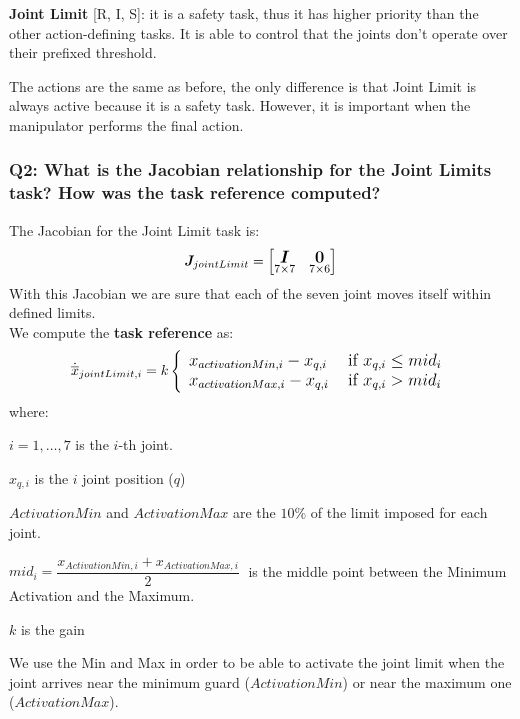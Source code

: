 \documentclass{article}
\newcommand{\ocio} {\marginpar{!}}
\begin{document}
\begin{description}
\item \textbf{Joint Limit} [R, I, S]: it is a safety task, thus it has higher priority than the other action-defining tasks. It is able to control that the joints don't operate over their prefixed threshold. \ocio
\end{description}

The actions are the same as before, the only difference is that Joint Limit is always active because it is a safety task. However, it is important when the manipulator performs the final action. 

\subsubsection{Q2: What is the Jacobian relationship for the Joint Limits task? How was the task reference computed?}
The Jacobian for the Joint Limit task is:
\begin{equation}
\large
\boldsymbol{J}_{jointLimit}=
    \begin{bmatrix}
     \underset{7\times 7}{\boldsymbol{I}} & \underset{7\times6}{\boldsymbol{0}} \\
    \end{bmatrix}
\end{equation}
With this Jacobian we are sure that each of the seven joint moves itself within defined limits.
\\
We compute the \textbf{task reference} as:
\begin{equation}
\large
\dot{\overline{x}}_{jointLimit,i} =k \left\{\begin{array}{ll}
x_{activationMin,i}-x_{q, i} & \text { if } x_{q, i} \leq mid_{i} \\
x_{activationMax,i}-x_{q, i} & \text { if } x_{q, i}>mid_{i}
\end{array}\right.
\end{equation}
 where:
 \begin{description}
  \item $i = 1,\dots,7$ is the $i$-th joint.
  \item $x_{q,i}$ is the $i$ joint position ($q$)
  \item $ActivationMin$ and $ActivationMax$ are the $10\%$ of the limit imposed for each joint.
  \item $mid_i = \dfrac{x_{ActivationMin,i} + x_{ActivationMax,i}}{2}\; $ is the middle point between the Minimum Activation and the Maximum.
  \item $k$ is the gain
\end{description}
We use the Min and Max in order to be able to activate the joint limit when the joint arrives near the minimum guard ($ActivationMin$) or near the maximum one ($ActivationMax$).
\clearpage
\end{document}
